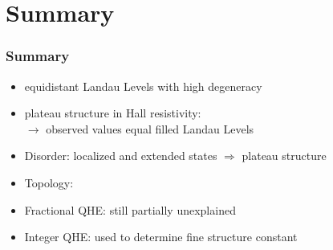 \section[Summary]{Summary}
\begin{frame}
\frametitle{Summary}
\begin{itemize}
	\item equidistant Landau Levels with high degeneracy\\
	
	\item plateau structure in Hall resistivity: \quad
	\\
	\vspace{0.05cm}
	$\rightarrow$ observed values equal filled Landau Levels 
	\vspace{0.2cm}
	\item Disorder: localized and extended states $\Rightarrow$ plateau structure
	\vspace{0.05cm}
	\item Topology: %
	\quad {}
	\vspace{0.1cm}
	\item Fractional QHE: still partially unexplained
	\vspace{0.2cm}
	\item Integer QHE: used to determine fine structure constant  
\end{itemize}

\end{frame}





